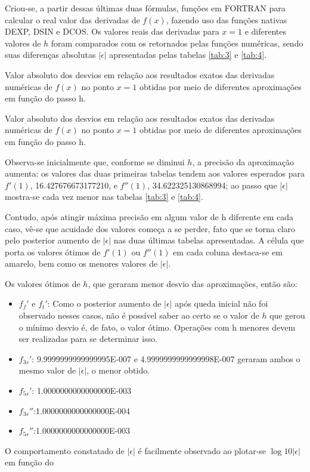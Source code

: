 \message{ !name(relatorio.tex)}\documentclass{article}
\begin{document}
Criou-se, a partir dessas últimas duas fórmulas, funções em FORTRAN para calcular o real valor das derivadas de $f(x)$, fazendo uso das funções nativas DEXP, DSIN e DCOS. Os valores reais das derivadas para $x=1$ e diferentes valores de $h$ foram comparados com os retornados pelas funções numéricas, sendo suas diferenças absolutas $|\epsilon|$ apresentadas pelas tabelas \ref{tab:3} e \ref{tab:4}.


\begin{table}[h]
  \centering
  
  \caption{Valor absoluto dos desvios em relação aos resultados exatos das derivadas numéricas de $f (x)$ no ponto $x = 1$ obtidas por meio de diferentes aproximações em função do passo h.}
  \label{tab:3}
\end{table}

\begin{table}[h]
  \centering
  
  \caption{Valor absoluto dos desvios em relação aos resultados exatos das derivadas numéricas de $f(x)$ no ponto $x = 1$ obtidas por meio de diferentes aproximações em função do passo h.}
  \label{tab:4}
\end{table}

Observa-se inicialmente que, conforme se diminui $h$, a precisão da aproximação aumenta: os valores das duas primeiras tabelas tendem aos valores esperados para $f'(1)$, 16.427676673177210, e $f''(1)$, 34.622325130868994; ao passo que $|\epsilon|$ mostra-se cada vez menor nas tabelas \ref{tab:3} e \ref{tab:4}.\par
Contudo, após atingir máxima precisão em algum valor de h diferente em cada caso, vê-se que acuidade dos valores começa a se perder, fato que se torna claro pelo posterior aumento de  $|\epsilon|$ nas duas últimas tabelas apresentadas. A célula que porta os valores ótimos de $f'(1)$ ou $f''(1)$ em cada coluna destaca-se em amarelo, bem como os menores valores de $|\epsilon|$.\par
Os valores ótimos de $h$, que geraram menor desvio das aproximações, então são:

\begin{itemize}
\item $f_f'$ e \(f_t'\): Como o posterior aumento de $|\epsilon|$ após queda inicial não foi observado nesses casos, não é possível saber ao certo se o valor de $h$ que gerou o mínimo desvio é, de fato, o valor ótimo. Operações com h menores devem ser realizadas para se determinar isso.
\item \(f_{3s}'\): 9.9999999999999995E-007 e 4.9999999999999998E-007 geraram ambos o mesmo valor de $|\epsilon|$, o menor obtido.
\item \(f_{5s}'\): 1.0000000000000000E-003
\item \(f_{3s}''\):1.0000000000000000E-004
\item \(f_{5s}''\):1.0000000000000000E-003
\end{itemize}

O comportamento constatado de $|\epsilon|$ é facilmente observado ao plotar-se $\log10{|\epsilon|}$ em função do
\end{document}
